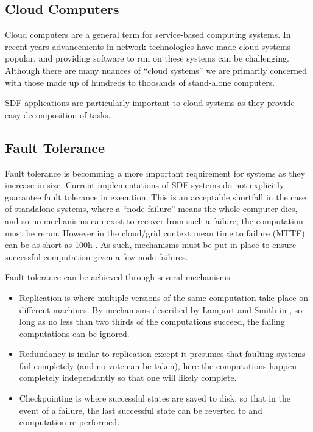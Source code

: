 \subsection{Cloud Computers}
Cloud computers are a general term for service-based computing systems.
In recent years advancements in network technologies have made cloud systems popular, and providing software to run on these systems can be challenging.
Although there are many nuances of ``cloud systems'' we are primarily concerned with those made up of hundreds to thoosands of stand-alone computers.

SDF applications are particularly important to cloud systems as they provide easy decomposition of tasks.

\subsection{Fault Tolerance}
Fault tolerance is becomming a more important requirement for systems as they increase in size.
Current implementations of SDF systems \cite{mal08, thies02, thies10} do not explicitly guarantee fault tolerance in execution.
This is an acceptable shortfall in the case of standalone systems, where a ``node failure'' means the whole computer dies, and so no mechanisms can exist to recover from such a failure, the computation must be rerun.
However in the cloud/grid context mean time to failure (MTTF) can be as short as 100h \cite{ree06}.
As such, mechanisms must be put in place to ensure successful computation given a few node failures.

Fault tolerance can be achieved through several mechanisms:
\begin{itemize}
	\item Replication is where multiple versions of the same computation take place on different machines.  By mechanisms described by Lamport and Smith in \cite{lam86}, so long as no less than two thirds of the computations succeed, the failing computations can be ignored.
	\item Redundancy is imilar to replication except it presumes that faulting systems fail completely (and no vote can be taken), here the computations happen completely independantly so that one will likely complete.
	\item Checkpointing is where successful states are saved to disk, so that in the event of a failure, the last successful state can be reverted to and computation re-performed.
\end{itemize}

